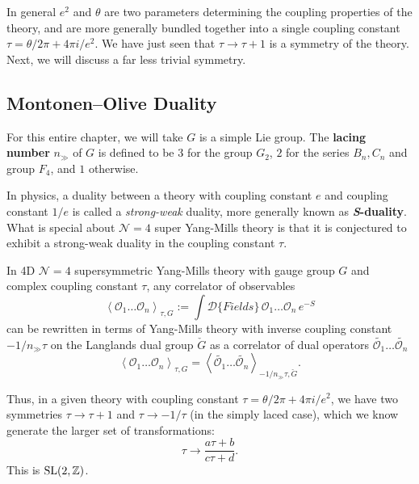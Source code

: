 In general $e^2$ and $\theta$ are two parameters determining the coupling properties of the theory, and are more generally bundled together into a single coupling constant $\tau = \theta/2\pi + 4\pi i/e^2$. We have just seen that $\tau \to \tau+1$ is a symmetry of the theory. Next, we will discuss a far less trivial symmetry. 


\subsection{Montonen--Olive Duality} %
\label{sub:montonen_olive_duality}

	For this entire chapter, we will take $G$ is a simple Lie group. The \textbf{lacing number} $n_{\gg}$ of $G$ is defined to be $3$ for the group $G_2$, $2$ for the series $B_n, C_n$ and group $F_4$, and $1$ otherwise. %

	In physics, a duality between a theory with coupling constant $e$ and coupling constant $1/e$ is called a \emph{strong-weak} duality, more generally known as \textbf{\emph{S}-duality}. What is special about $\mathcal N=4$ super Yang-Mills theory is that it is conjectured to exhibit a strong-weak duality in the coupling constant $\tau$. 
	

	\begin{concept}
		In 4D $\mathcal N = 4$ supersymmetric Yang-Mills theory with gauge group $G$ and complex coupling constant $\tau$, any correlator of observables
		\[
			\left< \mathcal O_1 \dots \mathcal O_n \right>_{\tau, G} := \int \mathcal{D}\{ Fields \}\, \mathcal O_1 \dots \mathcal O_n \, e^{-S}
		\]
		can be rewritten in terms of Yang-Mills theory with inverse coupling constant $-1/n_{\gg} \tau$ on the Langlands dual group $\check G$ as a correlator of dual operators $\tilde {\mathcal O_1} \dots \tilde {\mathcal O_n}$
		\[
			\left< \mathcal O_1 \dots \mathcal O_n \right>_{\tau, G} = \left< \tilde{\mathcal O_1} \dots \tilde{\mathcal O_n} \right>_{-1/n_\gg \tau, \check G}.
		\]
	\end{concept}
	
	Thus, in a given theory with coupling constant $\tau = \theta/2\pi + 4\pi i/e^2$, we have two symmetries $\tau \to \tau+1$ and $\tau \to -1/\tau$ (in the simply laced case), which we know generate the larger set of transformations:
	\[
		\tau \to \frac{a \tau + b}{c \tau + d}.
	\]
	This is $\mathrm{SL}(2, \mathbb{Z})$.
	
